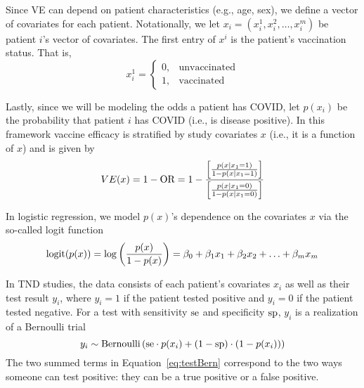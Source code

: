 \documentclass[11pt,notitlepage,twoside]{article}
\begin{document}
Since VE can depend on patient characteristics (e.g., age, sex), we define a vector of covariates for each patient. Notationally, we let $x_i = (x_i^1, x_i^2, \ldots, x_i^m)$ be patient $i$'s vector of covariates. The first entry of $x^i$ is the patient's vaccination status. That is,
\begin{equation}
x_i^1 = \begin{cases}
  0, & \text{unvaccinated} \\ 1, & \text{vaccinated} 
\end{cases}
\end{equation}

Lastly, since we will be modeling the odds a patient has COVID, let $p(x_i)$ be the probability that patient $i$ has COVID (i.e., is disease positive). In this framework vaccine efficacy is stratified by study covariates $x$ (i.e., it is a function of $x$) and is given by 
\begin{equation}\label{eq:tndve}
  VE(x) = 1 - \text{OR} = 1 - \frac{\left[ \frac{p(x \mid x_1=1)}{1-p(x \mid x_1=1)} \right]}{ \left[ \frac{p(x \mid x_1=0)}{1-p(x \mid x_1=0)} \right]} 
\end{equation}

In logistic regression, we model $p(x)$'s dependence on the covariates $x$ via the so-called logit function
\begin{equation}\label{eq:logodds}
\text{logit}(p(x)) = \log\left( \frac{p(x)}{1-p(x)} \right) = \beta_0 + \beta_1 x_1 + \beta_2 x_2 + \ldots + \beta_m x_m 
\end{equation}

In TND studies, the data consists of each patient's covariates $x_i$ as well as their test result $y_i$, where $y_i = 1$ if the patient tested positive and $y_i = 0$ if the patient tested negative. For a test with sensitivity $\text{se}$ and specificity $\text{sp}$, $y_i$ is a realization of a Bernoulli trial
\begin{equation}\label{eq:testBern}
y_i \sim \text{Bernoulli}\left(\text{se} \cdot p(x_i) + (1 - \text{sp}) \cdot (1 - p(x_i)) \right)
\end{equation}
The two summed terms in Equation~\eqref{eq:testBern} correspond to the two ways someone can test positive: they can be a true positive or a false positive. 
\end{document}
